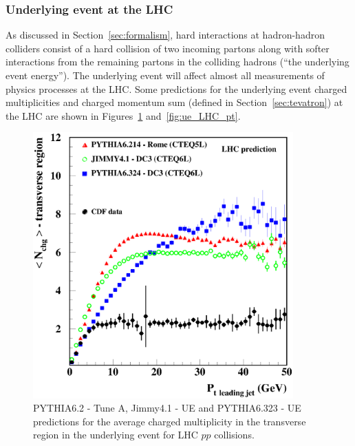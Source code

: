 \documentclass[12pt]{iopart}
\begin{document}
\subsubsection{Underlying event at the LHC}
\label{sec:UELHC}

As discussed in Section~\ref{sec:formalism}, hard interactions at hadron-hadron colliders consist of a hard collision of two
incoming partons along with softer interactions from the remaining partons in the colliding hadrons (``the
underlying event energy''). The underlying event will affect almost all measurements of physics processes at the LHC. Some predictions for the underlying event charged multiplicities and charged
momentum sum (defined in Section~\ref{sec:tevatron}) at the LHC are shown in Figures~\ref{fig:ue_LHC} and~\ref{fig:ue_LHC_pt}.
%
\begin{figure}[t]
\begin{center}
\includegraphics[width=10cm]{mult-trans-lhc.eps}
\end{center}
\caption{PYTHIA6.2 - Tune A, Jimmy4.1 - UE and PYTHIA6.323 - UE
predictions for the average charged multiplicity in the transverse region in the underlying 
event for LHC $pp$ collisions.
\label{fig:ue_LHC}
}
\end{figure}
%
%
\end{document}
